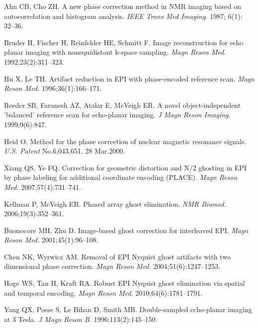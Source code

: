 \documentclass[num-refs]{wiley-article}
\newcommand{\0}{{\boldsymbol{0}}}
\newcommand{\1}{\blmath{1}}
\begin{document}
	\begin{thebibliography}{10}
		
		Ahn CB, Cho ZH.
		\newblock A new phase correction method in NMR imaging based on autocorrelation and histogram analysis.
		\newblock \textit{IEEE Trans Med Imaging.} 1987; 6(1): 32--36.
		
		Bruder H, Fischer H, Reinfelder HE, Schmitt F.
		\newblock Image reconstruction for echo planar imaging with nonequidistant k-space sampling.
		\newblock \textit{Magn Reson Med.} 1992;23(2):311–323.
		
		Hu X, Le TH.
		\newblock Artifact reduction in EPI with phase-encoded reference scan.
		\newblock \textit{Magn Reson Med.} 1996;36(1):166–171.
		
		Reeder SB, Faranesh AZ, Atalar E, McVeigh ER. 
		\newblock A novel object-independent 'balanced' reference scan for echo-planar imaging.
		\newblock \textit{J Magn Reson Imaging.} 1999;9(6):847.
		
		Heid O.
		\newblock Method for the phase correction of nuclear magnetic resonance signals.
		\newblock \textit{U.S. Patent} No.6,043,651. 28 Mar.2000.
		
		Xiang QS, Ye FQ.  
		\newblock Correction for geometric distortion and N/2 ghosting in EPI by phase labeling for additional coordinate encoding (PLACE).
		\newblock \textit{Magn Reson Med.} 2007;57(4):731–741.
		
		Kellman P, McVeigh ER.  
		\newblock Phased array ghost elimination.
		\newblock \textit{NMR Biomed.} 2006;19(3):352–361.
		
		Buonocore MH, Zhu D.  
		\newblock Image-based ghost correction for interleaved EPI.
		\newblock \textit{Magn Reson Med.} 2001;45(1):96–108.
		
		Chen NK, Wyrwicz AM.   
		\newblock Removal of EPI Nyquist ghost artifacts with two dimensional phase correction.
		\newblock \textit{Magn Reson Med.} 2004;51(6):1247–1253.
		
		Hoge WS, Tan H, Kraft RA. 
		\newblock Robust EPI Nyquist ghost elimination via spatial and temporal encoding.
		\newblock \textit{Magn Reson Med.} 2010;64(6):1781–1791.
		
		Yang QX, Posse S, Le Bihan D, Smith MB. 
		\newblock Double-sampled echo-planar imaging at 3 Tesla.
		\newblock \textit{J Magn Reson B.} 1996;113(2):145–150.
		

\end{thebibliography}
\end{document}
